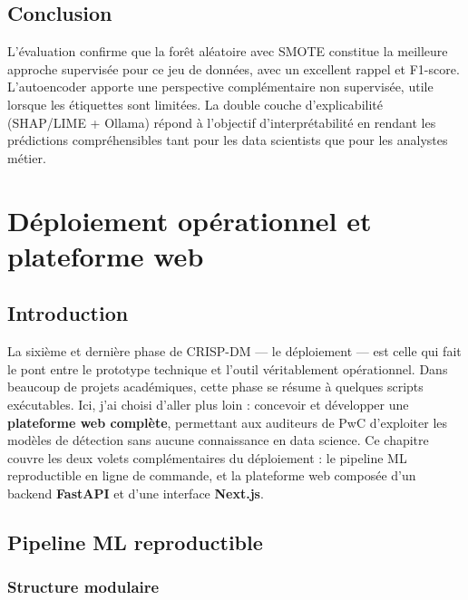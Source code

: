 \documentclass[12pt,a4paper,twoside]{report}
\begin{document}
\section{Conclusion}

L'évaluation confirme que la forêt aléatoire avec SMOTE constitue la meilleure approche supervisée pour ce jeu de données, avec un excellent rappel et F1-score. L'autoencoder apporte une perspective complémentaire non supervisée, utile lorsque les étiquettes sont limitées. La double couche d'explicabilité (SHAP/LIME + Ollama) répond à l'objectif d'interprétabilité en rendant les prédictions compréhensibles tant pour les data scientists que pour les analystes métier.

\chapter{Déploiement opérationnel et plateforme web}

\section{Introduction}

La sixième et dernière phase de CRISP-DM --- le déploiement --- est celle qui fait le pont entre le prototype technique et l'outil véritablement opérationnel. Dans beaucoup de projets académiques, cette phase se résume à quelques scripts exécutables. Ici, j'ai choisi d'aller plus loin : concevoir et développer une \textbf{plateforme web complète}, permettant aux auditeurs de PwC d'exploiter les modèles de détection sans aucune connaissance en data science. Ce chapitre couvre les deux volets complémentaires du déploiement : le pipeline ML reproductible en ligne de commande, et la plateforme web composée d'un backend \textbf{FastAPI} et d'une interface \textbf{Next.js}.


\section{Pipeline ML reproductible}

\subsection{Structure modulaire}
\end{document}

